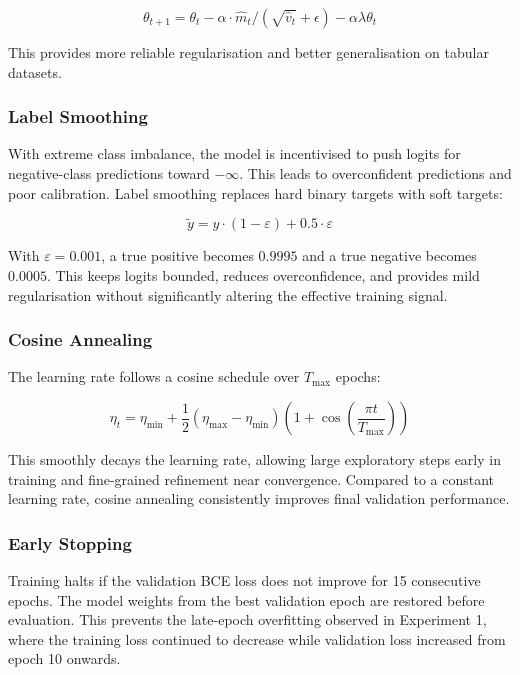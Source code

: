 \documentclass[12pt, a4paper]{article}
\begin{document}
\begin{equation}
\theta_{t+1} = \theta_t - \alpha \cdot \hat{m}_t / (\sqrt{\hat{v}_t} + \epsilon) - \alpha \lambda \theta_t
\end{equation}

This provides more reliable regularisation and better generalisation on tabular datasets.

\subsubsection{Label Smoothing}

With extreme class imbalance, the model is incentivised to push logits for negative-class predictions toward $-\infty$. This leads to overconfident predictions and poor calibration. Label smoothing replaces hard binary targets with soft targets:

\begin{equation}
\tilde{y} = y \cdot (1 - \varepsilon) + 0.5 \cdot \varepsilon
\end{equation}

With $\varepsilon = 0.001$, a true positive becomes $0.9995$ and a true negative becomes $0.0005$. This keeps logits bounded, reduces overconfidence, and provides mild regularisation without significantly altering the effective training signal.

\subsubsection{Cosine Annealing}

The learning rate follows a cosine schedule over $T_{\max}$ epochs:

\begin{equation}
\eta_t = \eta_{\min} + \frac{1}{2}(\eta_{\max} - \eta_{\min})\left(1 + \cos\!\left(\frac{\pi t}{T_{\max}}\right)\right)
\end{equation}

This smoothly decays the learning rate, allowing large exploratory steps early in training and fine-grained refinement near convergence. Compared to a constant learning rate, cosine annealing consistently improves final validation performance.

\subsubsection{Early Stopping}

Training halts if the validation BCE loss does not improve for 15 consecutive epochs. The model weights from the best validation epoch are restored before evaluation. This prevents the late-epoch overfitting observed in Experiment 1, where the training loss continued to decrease while validation loss increased from epoch 10 onwards.
\end{document}
